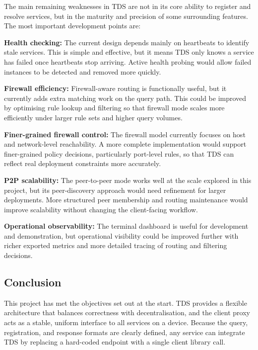 \documentclass[10pt,a4paper]{article}
\begin{document}
The main remaining weaknesses in TDS are not in its core ability to register and resolve services, but in the maturity and precision of some surrounding features. The most important development points are:

\textbf{Health checking:} The current design depends mainly on heartbeats to identify stale services. This is simple and effective, but it means TDS only knows a service has failed once heartbeats stop arriving. Active health probing would allow failed instances to be detected and removed more quickly.

\textbf{Firewall efficiency:} Firewall-aware routing is functionally useful, but it currently adds extra matching work on the query path. This could be improved by optimising rule lookup and filtering so that firewall mode scales more efficiently under larger rule sets and higher query volumes.

\textbf{Finer-grained firewall control:} The firewall model currently focuses on host and network-level reachability. A more complete implementation would support finer-grained policy decisions, particularly port-level rules, so that TDS can reflect real deployment constraints more accurately.

\textbf{P2P scalability:} The peer-to-peer mode works well at the scale explored in this project, but its peer-discovery approach would need refinement for larger deployments. More structured peer membership and routing maintenance would improve scalability without changing the client-facing workflow.

\textbf{Operational observability:} The terminal dashboard is useful for development and demonstration, but operational visibility could be improved further with richer exported metrics and more detailed tracing of routing and filtering decisions.

\subsection{Conclusion}
This project has met the objectives set out at the start. TDS provides a flexible architecture that balances correctness with decentralisation, and the client proxy acts as a stable, uniform interface to all services on a device. Because the query, registration, and response formats are clearly defined, any service can integrate TDS by replacing a hard-coded endpoint with a single client library call.
\end{document}
